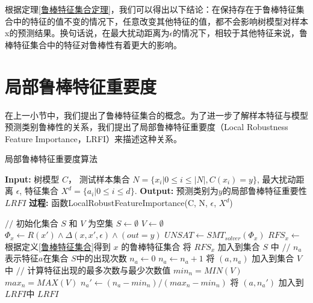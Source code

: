 根据定理\ref{鲁棒特征集合定理}，我们可以得出以下结论：在保持存在于鲁棒特征集合中的特征的值不变的情况下，任意改变其他特征的值，都不会影响树模型对样本x的预测结果。换句话说，在最大扰动距离为$\epsilon$的情况下，相较于其他特征来说，鲁棒特征集合中的特征对鲁棒性有着更大的影响。

\section{局部鲁棒特征重要度}
在上一小节中，我们提出了鲁棒特征集合的概念。为了进一步了解样本特征与模型预测类别鲁棒性的关系，我们提出了局部鲁棒特征重要度（Local Robustness Feature Importance，LRFI）来描述这种关系。

\begin{algorithm}[!htb]
	\caption{局部鲁棒特征重要度算法}
	\label{LRFI algorithm}
	\begin{algorithmic}[1]
		\footnotesize
		\STATE \textbf{Input:} 树模型 $C$， 测试样本集合 $N=\{x_i | 0 \le i \le |N|, C(x_i)=y \}$, 最大扰动距离 $\epsilon$, 特征集合 $X^d=\{a_i | 0 \le i \le d\}$.
		\STATE \textbf{Output:} 预测类别为$y$的局部鲁棒特征重要性$LRFI$
		\STATE \textbf{过程:} 函数LocalRobustFeatureImportance(C, N, $\epsilon$, $X^d$)
        
    \STATE $//$ 初始化集合 $S$ 和 $V$ 为空集   
    \STATE $S\leftarrow \emptyset$ %
    \STATE $V\leftarrow \emptyset$ %
       \STATE $\Phi_x \leftarrow R(x') \land \Delta(x,x',\epsilon) \land (out=y)$ \;
       \STATE $UNSAT \leftarrow SMT_{solver}(\Phi_x)$ \;
       \STATE $RFS_x \leftarrow$ 根据定义\ref{鲁棒特征集合}得到 $x$ 的鲁棒特征集合\;
       \STATE 将 $RFS_{x}$ 加入到集合 $S$ 中 \;   
    \ENDFOR   
        \STATE $//$ $n_a$表示特征$a$在集合 $S$中的出现次数 
        \STATE $n_a  \leftarrow 0$  %
               \STATE $n_a  \leftarrow n_a + 1$  \;
            \ENDIF
        \ENDFOR
        \STATE 将 $(a, n_a)$ 加入到集合 $V$ 中 \;  
    \ENDFOR
     \STATE $//$ 计算特征出现的最多次数与最少次数值
    \STATE $min_n = MIN(V)$ \;
    \STATE $max_n = MAX(V)$ \;
        \STATE $n_a' \leftarrow (n_a-min_n)/(max_n-min_n)$ \;
        \STATE 将 $(a, n_a')$ 加入到 $LRFI$中\;  
   \ENDFOR
   \RETURN $LRFI$ 
	\end{algorithmic}
\end{algorithm}

